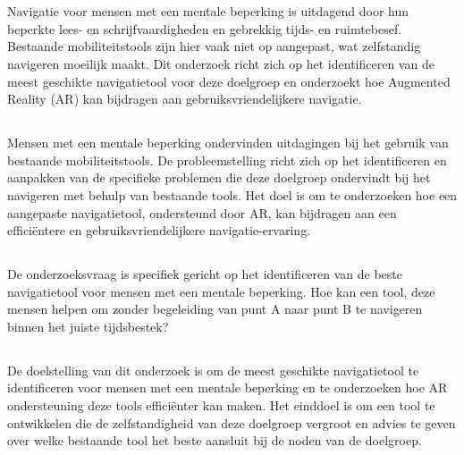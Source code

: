 \chapter{}%
\label{ch:inleiding}
Navigatie voor mensen met een mentale beperking is uitdagend door hun beperkte lees- en schrijfvaardigheden en gebrekkig tijds- en ruimtebesef. Bestaande mobiliteitstools zijn hier vaak niet op aangepast, wat zelfstandig navigeren moeilijk maakt. Dit onderzoek richt zich op het identificeren van de meest geschikte navigatietool voor deze doelgroep en onderzoekt hoe Augmented Reality (AR) kan bijdragen aan gebruiksvriendelijkere navigatie.

\section{}%
\label{sec:probleemstelling}

Mensen met een mentale beperking ondervinden uitdagingen bij het gebruik van bestaande mobiliteitstools. De probleemstelling richt zich op het identificeren en aanpakken van de specifieke problemen die deze doelgroep ondervindt bij het navigeren met behulp van bestaande tools. Het doel is om te onderzoeken hoe een aangepaste navigatietool, ondersteund door AR, kan bijdragen aan een efficiëntere en gebruiksvriendelijkere navigatie-ervaring.

\section{}%
\label{sec:onderzoeksvraag}

De onderzoeksvraag is specifiek gericht op het identificeren van de beste navigatietool voor mensen met een mentale beperking. Hoe kan een tool, deze mensen helpen om zonder begeleiding van punt A naar punt B te navigeren binnen het juiste tijdsbestek?

\section{}%
\label{sec:onderzoeksdoelstelling}

De doelstelling van dit onderzoek is om de meest geschikte navigatietool te identificeren voor mensen met een mentale beperking en te onderzoeken hoe AR ondersteuning deze tools efficiënter kan maken. Het einddoel is om een tool te ontwikkelen die de zelfstandigheid van deze doelgroep vergroot en advies te geven over welke bestaande tool het beste aansluit bij de noden van de doelgroep.

